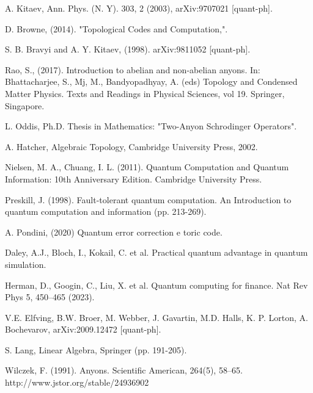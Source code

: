 \documentclass[12pt]{report}
\begin{document}
	\begin{thebibliography}{99} %
		 A. Kitaev, Ann. Phys. (N. Y). 303, 2 (2003),
		arXiv:9707021 [quant-ph].
		
		
		
		 D. Browne, (2014). "Topological Codes and Computation,".
		
		 S. B. Bravyi and A. Y. Kitaev, (1998).
		arXiv:9811052 [quant-ph].
		
		  Rao, S., (2017). Introduction to abelian and non-abelian anyons. In: Bhattacharjee, S., Mj, M., Bandyopadhyay, A. (eds) Topology and Condensed Matter Physics. Texts and Readings in Physical Sciences, vol 19. Springer, Singapore. %
		
		
		 L. Oddis, Ph.D. Thesis in Mathematics: "Two-Anyon Schrodinger Operators".
		
		 A. Hatcher, Algebraic Topology, Cambridge University Press, 2002.
		
		 Nielsen, M. A., Chuang, I. L. (2011). Quantum Computation and Quantum Information: 10th Anniversary Edition. Cambridge University Press.
		
		 Preskill, J. (1998). Fault-tolerant quantum computation. An Introduction to quantum computation and information (pp. 213-269).
		
		 A. Pondini, (2020) Quantum error correction e toric code.
		
		 Daley, A.J., Bloch, I., Kokail, C. et al. Practical quantum advantage in quantum simulation.
		
		 Herman, D., Googin, C., Liu, X. et al. Quantum computing for finance. Nat Rev Phys 5, 450–465 (2023).
		
		 V.E. Elfving, B.W. Broer, M. Webber, J. Gavartin, M.D. Halls, K. P. Lorton, A. Bochevarov, arXiv:2009.12472 [quant-ph].
		
		 S. Lang, Linear Algebra, Springer (pp. 191-205).
		
		 Wilczek, F. (1991). Anyons. Scientific American, 264(5), 58–65. http://www.jstor.org/stable/24936902
  
	\end{thebibliography}
	
\end{document}
